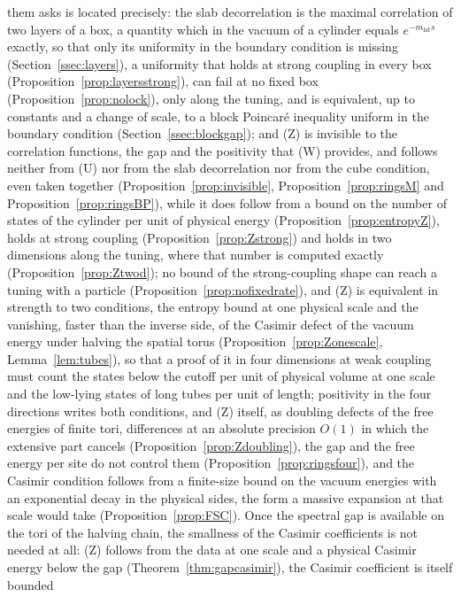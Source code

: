 them asks is located precisely: the slab decorrelation is the maximal
correlation of two layers of a box, a quantity which in the vacuum of a
cylinder equals $e^{-m_{\mathrm{lat}}s}$ exactly, so that only its
uniformity in the boundary condition is missing
(Section~\ref{ssec:layers}), a uniformity that holds at strong coupling in
every box (Proposition~\ref{prop:layersstrong}), can fail at no fixed
box (Proposition~\ref{prop:nolock}), only along the tuning, and is
equivalent, up to constants and a change of scale, to a block Poincar\'e
inequality uniform in the boundary condition
(Section~\ref{ssec:blockgap}); and (Z) is invisible to the correlation
functions, the gap and the positivity that (W) provides, and follows
neither from (U) nor from the slab decorrelation nor from the cube
condition, even taken together (Proposition~\ref{prop:invisible},
Proposition~\ref{prop:ringsM} and Proposition~\ref{prop:ringsBP}), while
it does follow from a bound on the number of states of the cylinder per
unit of physical energy (Proposition~\ref{prop:entropyZ}), holds at
strong coupling (Proposition~\ref{prop:Zstrong}) and holds in two
dimensions along the tuning, where that number is computed exactly
(Proposition~\ref{prop:Ztwod}); no bound of the strong-coupling shape can
reach a tuning with a particle (Proposition~\ref{prop:nofixedrate}), and
(Z) is equivalent in strength to two conditions, the entropy bound at one
physical scale and the vanishing, faster than the inverse side, of the
Casimir defect of the vacuum energy under halving the spatial torus
(Proposition~\ref{prop:Zonescale}, Lemma~\ref{lem:tubes}), so that a proof of
it in four dimensions at weak coupling must count the states below the
cutoff per unit of physical volume at one scale and the low-lying states of
long tubes per unit of length; positivity in the four directions writes
both conditions, and (Z) itself, as doubling defects of the free energies of
finite tori, differences at an absolute precision $O(1)$ in which the
extensive part cancels (Proposition~\ref{prop:Zdoubling}), the gap and the
free energy per site do not control them (Proposition~\ref{prop:ringsfour}),
and the Casimir condition follows from a finite-size bound on the vacuum
energies with an exponential decay in the physical sides, the form a massive
expansion at that scale would take (Proposition~\ref{prop:FSC}). Once
the spectral gap is available on the tori of the halving chain, the
smallness of the Casimir coefficients is not needed at all: (Z) follows
from the data at one scale and a physical Casimir energy below the gap
(Theorem~\ref{thm:gapcasimir}), the Casimir coefficient is itself bounded
